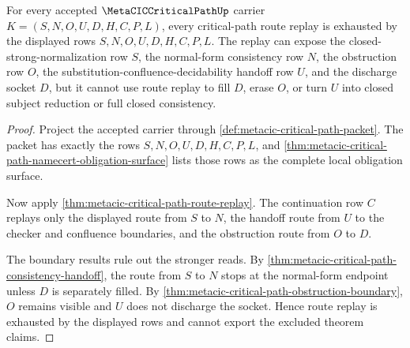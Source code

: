 \begin{theorem}
\label{thm:metacic-critical-path-route-exhaustion}
For every accepted $\MetaCICCriticalPathUp$ carrier $K=(S,N,O,U,D,H,C,P,L)$, every critical-path route replay is exhausted by the displayed rows $S,N,O,U,D,H,C,P,L$. The replay can expose the closed-strong-normalization row $S$, the normal-form consistency row $N$, the obstruction row $O$, the substitution-confluence-decidability handoff row $U$, and the discharge socket $D$, but it cannot use route replay to fill $D$, erase $O$, or turn $U$ into closed subject reduction or full closed consistency.
\end{theorem}
\begin{proof}
Project the accepted carrier through \autoref{def:metacic-critical-path-packet}. The packet has exactly the rows $S,N,O,U,D,H,C,P,L$, and \autoref{thm:metacic-critical-path-namecert-obligation-surface} lists those rows as the complete local obligation surface.

Now apply \autoref{thm:metacic-critical-path-route-replay}. The continuation row $C$ replays only the displayed route from $S$ to $N$, the handoff route from $U$ to the checker and confluence boundaries, and the obstruction route from $O$ to $D$.

The boundary results rule out the stronger reads. By \autoref{thm:metacic-critical-path-consistency-handoff}, the route from $S$ to $N$ stops at the normal-form endpoint unless $D$ is separately filled. By \autoref{thm:metacic-critical-path-obstruction-boundary}, $O$ remains visible and $U$ does not discharge the socket. Hence route replay is exhausted by the displayed rows and cannot export the excluded theorem claims.
\end{proof}

